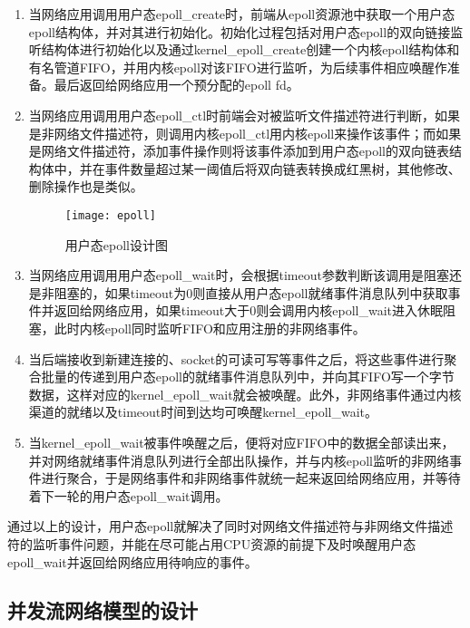 \begin{enumerate}[(1),labelsep=.5em, leftmargin = 0pt, itemindent = 3em]
\item 当网络应用调用用户态epoll\_create时，前端从epoll资源池中获取一个用户态epoll结构体，并对其进行初始化。初始化过程包括对用户态epoll的双向链接监听结构体进行初始化以及通过kernel\_epoll\_create创建一个内核epoll结构体和有名管道FIFO，并用内核epoll对该FIFO进行监听，为后续事件相应唤醒作准备。最后返回给网络应用一个预分配的epoll fd。
\item 当网络应用调用用户态epoll\_ctl时前端会对被监听文件描述符进行判断，如果是非网络文件描述符，则调用内核epoll\_ctl用内核epoll来操作该事件；而如果是网络文件描述符，添加事件操作则将该事件添加到用户态epoll的双向链表结构体中，并在事件数量超过某一阈值后将双向链表转换成红黑树，其他修改、删除操作也是类似。

\vspace{-10pt}
\begin{figure}[H] %
  \centering
  \texttt{[image: epoll]}
  \caption{用户态epoll设计图}
  \label{fig:epoll}
\end{figure}
\vspace{-10pt}

\item 当网络应用调用用户态epoll\_wait时，会根据timeout参数判断该调用是阻塞还是非阻塞的，如果timeout为0则直接从用户态epoll就绪事件消息队列中获取事件并返回给网络应用，如果timeout大于0则会调用内核epoll\_wait进入休眠阻塞，此时内核epoll同时监听FIFO和应用注册的非网络事件。
\item 当后端接收到新建连接的、socket的可读可写等事件之后，将这些事件进行聚合批量的传递到用户态epoll的就绪事件消息队列中，并向其FIFO写一个字节数据，这样对应的kernel\_epoll\_wait就会被唤醒。此外，非网络事件通过内核渠道的就绪以及timeout时间到达均可唤醒kernel\_epoll\_wait。
\item 当kernel\_epoll\_wait被事件唤醒之后，便将对应FIFO中的数据全部读出来，并对网络就绪事件消息队列进行全部出队操作，并与内核epoll监听的非网络事件进行聚合，于是网络事件和非网络事件就统一起来返回给网络应用，并等待着下一轮的用户态epoll\_wait调用。
\end{enumerate}

通过以上的设计，用户态epoll就解决了同时对网络文件描述符与非网络文件描述符的监听事件问题，并能在尽可能占用CPU资源的前提下及时唤醒用户态epoll\_wait并返回给网络应用待响应的事件。

\subsection{并发流网络模型的设计}

